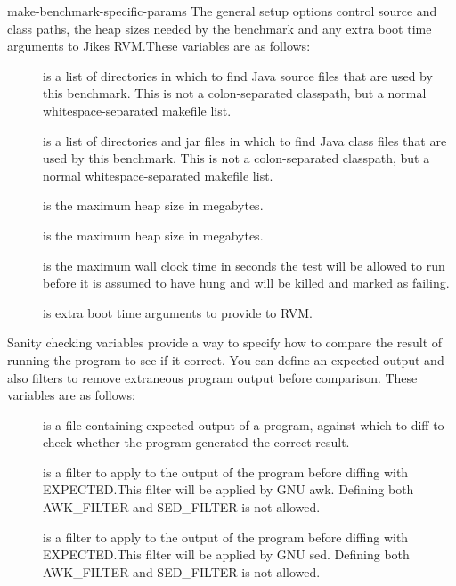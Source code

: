 \begin{description}
\begin{Label}{make-benchmark-specific-params}
 The general setup options control source and class paths, the heap
sizes needed by the benchmark and any extra boot time arguments to
Jikes RVM.\@  These variables are as follows:
\begin{description}
\item[] is a list of directories in which to find
Java\TMweb{} source files that are used by this benchmark.  This is not a
colon-separated classpath, but a normal whitespace-separated makefile
list.  
\item[] is a list of directories and jar files in
which to find Java class files that are used by this benchmark.  This
is not a colon-separated classpath, but a normal whitespace-separated
makefile list.  
\item[] is the maximum heap size in megabytes.
\item[] is the maximum heap size in megabytes.
\item[] is the maximum wall clock time in seconds
the test will be allowed to run before it is assumed to have hung and
will be killed and marked as failing.
\item[] is extra boot time arguments to provide to
RVM.\@ 
\end{description}

 Sanity checking variables provide a way to specify how to compare the
result of running the program to see if it correct.  You can define an
expected output and also filters to remove extraneous program output
before comparison.  These variables are as follows:
\begin{description}
\item[] is a file containing expected output of a program,
against which to diff to check whether the program generated the
correct result.
\item[] is a filter to apply to the output of the program
before diffing with EXPECTED.\@  This filter will be applied by GNU
awk. Defining both AWK\_FILTER and SED\_FILTER is not
allowed. 
\item[] is a filter to apply to the output of the program
before diffing with EXPECTED.\@  This filter will be applied by GNU sed.
Defining both AWK\_FILTER and SED\_FILTER is not allowed. 
\end{description}


\end{Label}
\end{description}
